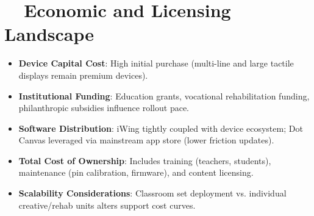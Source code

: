 \section{~~Economic and Licensing Landscape}
\label{sec:sr29-economics}
\begin{itemize}
	\item \textbf{Device Capital Cost}: High initial purchase (multi-line and large tactile displays remain premium devices).
	\item \textbf{Institutional Funding}: Education grants, vocational rehabilitation funding, philanthropic subsidies influence rollout pace\supercite{floridareading_monarch}.
	\item \textbf{Software Distribution}: iWing tightly coupled with device ecosystem; Dot Canvas leveraged via mainstream app store (lower friction updates)\supercite{dot_appstore}.
	\item \textbf{Total Cost of Ownership}: Includes training (teachers, students), maintenance (pin calibration, firmware), and content licensing.
	\item \textbf{Scalability Considerations}: Classroom set deployment vs. individual creative/rehab units alters support cost curves.
\end{itemize}

